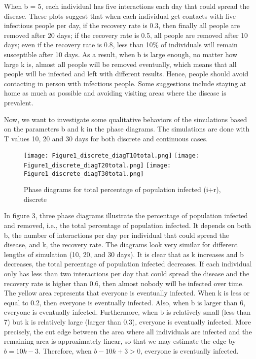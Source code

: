 \documentclass{article}
\begin{document}
When b = 5, each individual has five interactions each day that could spread the disease. These plots suggest that when each individual get contacts with five infectious people per day, if the recovery rate is 0.3, then finally all people are removed after 20 days; if the recovery rate is 0.5, all people are removed after 10 days; even if the recovery rate is 0.8, less than 10$\%$ of individuals will remain susceptible after 10 days. As a result, when b is large enough, no matter how large k is, almost all people will be removed eventually, which means that all people will be infected and left with different results. Hence, people should avoid contacting in person with infectious people. Some suggestions include staying at home as much as possible and avoiding visiting areas where the disease is prevalent. 


Now, we want to investigate some qualitative behaviors of the simulations based on the parameters b and k in the phase diagrams. 
The simulations are done with T values 10, 20 and 30 days for both discrete and continuous cases. 


\begin{figure}[htp]

\centering
\texttt{[image: Figure1\_discrete\_diagT10total.png]}\hfill
\texttt{[image: Figure1\_discrete\_diagT20total.png]}\hfill
\texttt{[image: Figure1\_discrete\_diagT30total.png]}

\caption{Phase diagrams for total percentage of population infected (i+r), discrete}
\label{fig:figure3}

\end{figure}



In figure 3, three phase diagrams illustrate the percentage of population infected and removed, i.e., the total percentage of population infected. It depends on both b, the number of interactions per day per individual that could spread the disease, and k, the recovery rate. The diagrams look very similar for different lengths of simulation (10, 20, and 30 days). It is clear that as k increases and b decreases, the total percentage of population infected decreases. If each individual only has less than two interactions per day that could spread the disease and the recovery rate is higher than 0.6, then almost nobody will be infected over time. The yellow area represents that everyone is eventually infected. When k is less or equal to 0.2, then everyone is eventually infected. Also, when b is larger than 6, everyone is eventually infected. Furthermore, when b is relatively small (less than 7) but k is relatively large (larger than 0.3), everyone is eventually infected. More precisely, the cut edge between the area where all individuals are infected and the remaining area is approximately linear, so that we may estimate the edge by $b = 10k - 3$. Therefore, when $b - 10k + 3 > 0$, everyone is eventually infected. 
\end{document}
